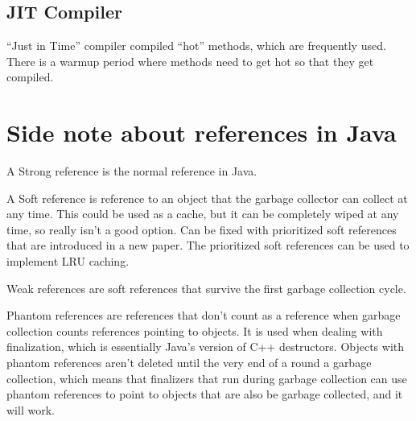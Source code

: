 \documentclass[twoside]{article}
\begin{document}
\subsection{JIT Compiler}
“Just in Time” compiler compiled “hot” methods, which are frequently used.  There is a warmup period where methods need to get hot so that they get compiled. 

\section{Side note about references in Java}
A Strong reference is the normal reference in Java.


A Soft reference is reference to an object that the garbage collector can collect at any time.  This could be used as a cache, but it can be completely wiped at any time, so really isn’t a good option. Can be fixed with prioritized soft references that are introduced in a new paper.  The prioritized soft references can be used to implement LRU caching.


Weak references are soft references that survive the first garbage collection cycle.


Phantom references are references that don’t count as a reference when garbage collection counts references pointing to objects.  It is used when dealing with finalization, which is essentially Java’s version of C++ destructors.  Objects with phantom references aren’t deleted until the very end of a round a garbage collection, which means that finalizers that run during garbage collection can use phantom references to point to objects that are also be garbage collected, and it will work.
\end{document}
